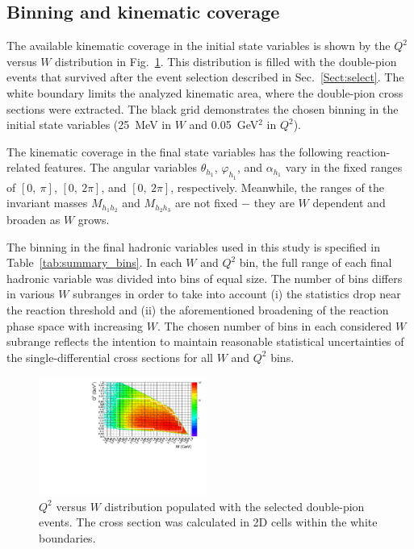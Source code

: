 \documentclass[prc,twocolumn,superscriptaddress,showpacs,amssymb,amsmath,amsfonts,aps,nofootinbib]{revtex4-1}
\begin{document}
\subsection{Binning and kinematic coverage}
\label{Sect:binning}



The available kinematic coverage in the initial state variables is shown by the $Q^2$ versus $W$ distribution in Fig.\!~\ref{fig:q2_vs_w}. This distribution is filled with the double-pion events that survived after the event selection described in Sec.\!~\ref{Sect:select}. The white boundary limits the analyzed kinematic area, where the double-pion cross sections were extracted. The black grid demonstrates the chosen binning in the initial state variables (25~MeV in $W$ and 0.05~GeV$^{2}$ in $Q^{2}$).


The kinematic coverage in the final state variables has the following reaction-related features. The angular variables $\theta_{h_{1}}$, $\varphi_{h_{1}}$, and $\alpha_{h_{1}}$ vary in the fixed ranges of $[0,~\pi]$, $[0,~2\pi]$, and $[0,~2\pi]$, respectively. Meanwhile, the ranges of the invariant masses $M_{h_{1}h_{2}}$ and $M_{h_{2}h_{3}}$ are not fixed $-$ they are $W$ dependent and broaden as $W$ grows. 



The binning in the final hadronic variables used in this study is specified in Table~\ref{tab:summary_bins}. In each $W$ and $Q^{2}$ bin, the full range of each final hadronic variable was divided into bins of equal size. The number of bins differs in various $W$ subranges in order to take into account (i) the statistics drop near the reaction threshold and (ii) the aforementioned broadening of the reaction phase space with increasing $W$. The chosen number of bins in each considered $W$ subrange reflects the intention to maintain reasonable statistical uncertainties of the single-differential cross sections for all $W$ and $Q^2$ bins. 

\begin{figure}[htp]
\begin{center}
\includegraphics[width=0.49\textwidth]{pictures/q2vsw_new2.pdf}
\caption{\small $Q^2$ versus $W$ distribution populated with the selected double-pion events. The cross section was calculated in 2D cells within the white boundaries.} \label{fig:q2_vs_w}
\end{center}
\end{figure}
\end{document}
